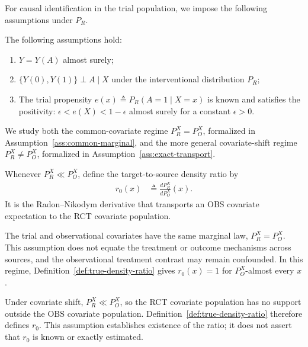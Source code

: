 For causal identification in the trial population, we impose the following assumptions under $P_R$.
\begin{assumption}
\label{ass:trial}
	The following assumptions hold: 
	\begin{enumerate}
		\item $Y=Y(A)$ almost surely;
		\item $\{Y(0),Y(1)\}\perp A\mid X$ under the interventional distribution $P_R$; 
		\item The trial propensity $e(x)\triangleq P_R(A=1\mid X=x)$ is known and satisfies the positivity: $\epsilon<e(X)<1-\epsilon$ almost surely for a constant $\epsilon>0$.
	\end{enumerate}
\end{assumption}
We study both the common-covariate regime $P_R^X=P_O^X$, formalized in Assumption~\ref{ass:common-marginal}, and the more general covariate-shift regime $P_R^X\neq P_O^X$, formalized in Assumption~\ref{ass:exact-transport}.

\begin{definition}
\label{def:true-density-ratio}
	Whenever $P_R^X\ll P_O^X$, define the target-to-source density ratio by
	\begin{align*}
		r_0(x) &\triangleq \frac{dP_R^X}{dP_O^X}(x).
	\end{align*}
	It is the Radon--Nikodym derivative that transports an OBS covariate expectation
	to the RCT covariate population.
\end{definition}

\enlargethispage{\baselineskip}
\begin{assumption}
	\label{ass:common-marginal}
	\label{ass:covariate}
	The trial and observational covariates have the same marginal law, $P_R^X=P_O^X$. This assumption does not equate the treatment or outcome mechanisms across sources, and the observational treatment contrast may remain confounded. In this regime, Definition~\ref{def:true-density-ratio} gives $r_0(x)=1$ for $P_O^X$-almost every $x$.
\end{assumption}

\begin{assumption}
\label{ass:exact-transport}
	Under covariate shift, $P_R^X\ll P_O^X$, so the RCT covariate population has
	no support outside the OBS covariate population. Definition~\ref{def:true-density-ratio}
	therefore defines $r_0$. This assumption establishes existence of the ratio;
	it does not assert that $r_0$ is known or exactly estimated.
\end{assumption}

